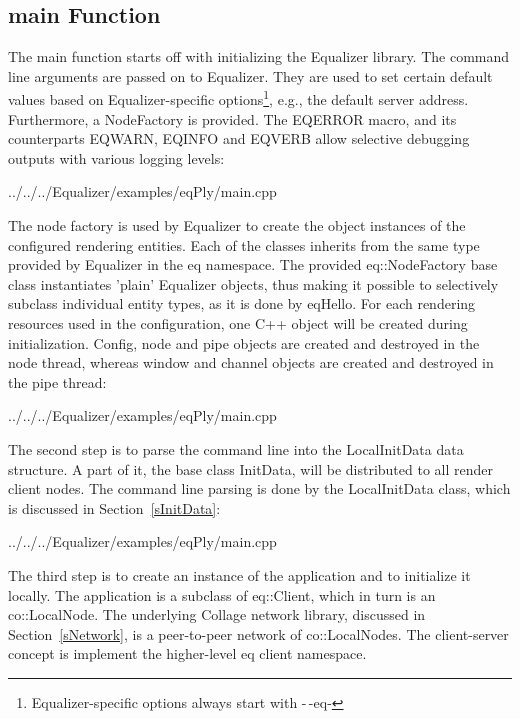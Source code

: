 \documentclass[10pt,a4]{scrartcl}
\newcommand{\sref}[1]{Section~\ref{#1}}
\begin{document}
\subsection{main Function}

The main function starts off with initializing the Equalizer library. The
command line arguments are passed on to Equalizer. They are used to set certain
default values based on Equalizer-specific options\footnote{Equalizer-specific
  options always start with -\,-eq-}, e.g., the default server
address. Furthermore, a \textsf{NodeFactory} is provided. The \textsf{EQERROR}
macro, and its counterparts \textsf{EQWARN}, \textsf{EQINFO} and \textsf{EQVERB}
allow selective debugging outputs with various logging levels:

{\footnotesize
  {../../../Equalizer/examples/eqPly/main.cpp}}

The node factory is used by Equalizer to create the object instances of
the configured rendering entities. Each of the classes inherits from the
same type provided by Equalizer in the \textsf{eq} namespace. The
provided \textsf{eq::NodeFactory} base class instantiates 'plain'
Equalizer objects, thus making it possible to selectively subclass
individual entity types, as it is done by \textsf{eqHello}. For each
rendering resources used in the configuration, one C++ object will be
created during initialization. Config, node and pipe objects are created and
destroyed in the node thread, whereas window and channel objects are
created and destroyed in the pipe thread:

{\footnotesize
  {../../../Equalizer/examples/eqPly/main.cpp}}

The second step is to parse the command line into the
\textsf{LocalInitData} data structure. A part of it, the base class
\textsf{InitData}, will be distributed to all render client nodes. The
command line parsing is done by the \textsf{LocalInitData} class, which
is discussed in \sref{sInitData}:

{\footnotesize
  {../../../Equalizer/examples/eqPly/main.cpp}}

The third step is to create an instance of the application and to initialize it
locally. The application is a subclass of \textsf{eq::Client}, which in turn is
an \textsf{co::LocalNode}. The underlying Collage network library, discussed in
\sref{sNetwork}, is a peer-to-peer network of \textsf{co::LocalNode}s. The
client-server concept is implement the higher-level \textsf{eq} client
namespace.
\end{document}
